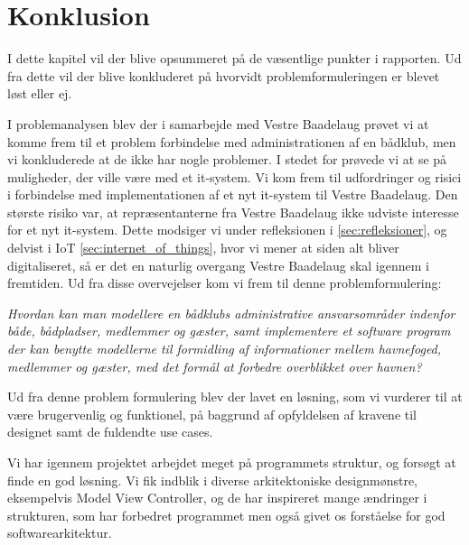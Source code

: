 \chapter{Konklusion}
\label{cha:konklusion}
I dette kapitel vil der blive opsummeret på de væsentlige punkter i rapporten. Ud fra dette vil der blive konkluderet på hvorvidt problemformuleringen er blevet løst eller ej.


I problemanalysen blev der i samarbejde med Vestre Baadelaug prøvet vi at komme frem til et problem forbindelse med administrationen af en bådklub, men vi konkluderede at de ikke har nogle problemer. I stedet for prøvede vi at se på muligheder, der ville være med et it-system. Vi kom frem til udfordringer og risici i forbindelse med implementationen af et nyt it-system til Vestre Baadelaug. Den største risiko var, at repræsentanterne fra Vestre Baadelaug ikke udviste interesse for et nyt it-system. Dette modsiger vi under refleksionen i \cref{sec:refleksioner}, og delvist i IoT \cref{sec:internet_of_things}, hvor vi mener at siden alt bliver digitaliseret, så er det en naturlig overgang Vestre Baadelaug skal igennem i fremtiden. Ud fra disse overvejelser kom vi frem til denne problemformulering:

\begin{displayquote}
\textit{Hvordan kan man modellere en bådklubs administrative ansvarsområder indenfor både, bådpladser, medlemmer og gæster, samt implementere et software program der kan benytte modellerne til formidling af informationer mellem havnefoged, medlemmer og gæster, med det formål at forbedre overblikket over havnen?}
\end{displayquote}


Ud fra denne problem formulering blev der lavet en løsning, som vi vurderer til at være brugervenlig og funktionel, på baggrund af opfyldelsen af kravene til designet samt de fuldendte use cases.

Vi har igennem projektet arbejdet meget på programmets struktur, og forsøgt at finde en god løsning. Vi fik indblik i diverse arkitektoniske designmønstre, eksempelvis Model View Controller, og de har inspireret mange ændringer i strukturen, som har forbedret programmet men også givet os forståelse for god softwarearkitektur.


